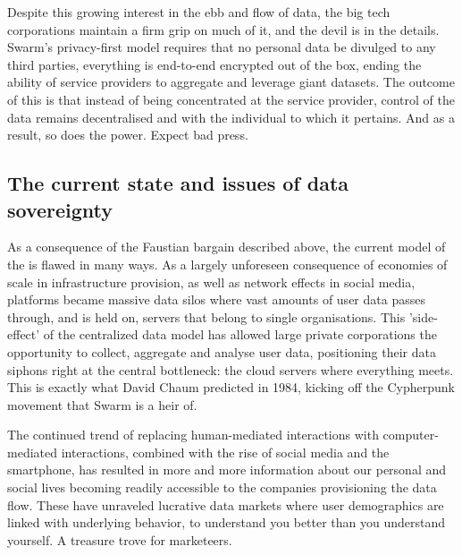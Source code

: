 Despite this growing interest in the ebb and flow of data, the big tech corporations maintain a firm grip on much of it, and the devil is in the details. Swarm's privacy-first model requires that no personal data be divulged to any third parties, everything is end-to-end encrypted out of the box, ending the ability of service providers to aggregate and leverage giant datasets. The outcome of this is that instead of being concentrated at the service provider, control of the data remains decentralised and with the individual to which it pertains. And as a result, so does the power. Expect bad press.

\subsection{The current state and issues of data sovereignty \statusgreen }\label{sec:data-sovereignty}

As a consequence of the Faustian bargain described above, the current model of the  is flawed in many ways. As a largely unforeseen consequence of economies of scale in infrastructure provision, as well as network effects in social media, platforms became massive data silos where vast amounts of user data passes through, and is held on, servers that belong to single organisations. This 'side-effect' of the centralized data model has allowed large private corporations the opportunity to collect, aggregate and analyse user data, positioning their data siphons right at the central bottleneck: the cloud servers where everything meets. This is exactly what David Chaum predicted in 1984, kicking off the Cypherpunk movement that Swarm is a heir of.

The continued trend of replacing human-mediated interactions with computer-mediated interactions, combined with the rise of social media and the smartphone, has resulted in more and more information about our personal and social lives becoming readily accessible to the companies provisioning the data flow. These have unraveled lucrative data markets where user demographics are linked with underlying behavior, to understand you better than you understand yourself. A treasure trove for marketeers.

